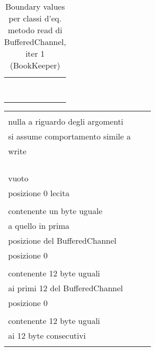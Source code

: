 \documentclass[10pt, a4paper]{article}
\newcommand{\Intmaketable}[4]{
	\begin{longtable}{#3}
	#4
	\caption{#2}
	\label{#1}
	\end{longtable}
}
\newcommand{\Intbvtable}[3]{
	\Intmaketable{#1}{#2}{|l|l|l|}{
	\hline
	\thead{Parametro formale} & \thead{Classe d'equivalenza} & \thead{Boundary value}\\
	\hline
	\hline
	#3
	\hline}
}
\newcommand{\Inttestctable}[3]{
	\Intmaketable{#1}{#2}{|l|l|l|}{
	\hline
	\thead{Input} & \thead{Esito atteso} & \thead{Motivazione}\\
	\hline
	\hline
	#3
	\hline}
}
\newcommand{\Intbvcaption}[4]{Boundary values per classi d'eq. metodo #1 di #2, iter #3 (#4)}
\newcommand{\Inttestccaption}[4]{Casi di test per metodo #1 di #2, iter. #3 (#4)}
\newcommand{\gettablelabel}[5]{table:#1:#2:#3:iter#4:proj#5}
\newcommand{\bvtable}[5]{
	\Intbvtable{\gettablelabel{bv}{#1}{#2}{#3}{#4}}
		{\Intbvcaption{#1}{#2}{#3}{#4}}
		{#5}
}
\newcommand{\testctable}[5]{
	\Inttestctable{\gettablelabel{testc}{#1}{#2}{#3}{#4}}
		{\Inttestccaption{#1}{#2}{#3}{#4}}
		{#5}
}
\newcommand{\tcell}{\makecell[tl]}
\newcommand{\newtrow}{\\ \hline}
\def\bookkeeper{BookKeeper}
\newcommand{\ceq}[1]{\{#1\}}
\begin{document}
	\bvtable{read}{BufferedChannel}{1}{\bookkeeper}{
			\tcell{dest} & \tcell{\ceq{null}} & \tcell{null}
		\newtrow
			\tcell{dest} & \tcell{\ceq{buffer di destinazione vuoto}} & \tcell{ByteBuf()}
		\newtrow
			\tcell{pos} & \tcell{\ceq{$< 0$}} & \tcell{$-1$}
		\newtrow
			\tcell{pos} & \tcell{\ceq{$\ge 0$}} & \tcell{$0$}
		\newtrow
			\tcell{length} & \tcell{\ceq{$< 0$}} & \tcell{$-1$}
		\newtrow
			\tcell{length} & \tcell{\ceq{$0$}} & \tcell{$0$}
		\newtrow
			\tcell{length} & \tcell{\ceq{$\ge 1$}} & \tcell{1}
		\newtrow
	}
	
	\testctable{read}{BufferedChannel}{1}{\bookkeeper}{
				\tcell{null, 0, 0} & 
				\tcell{NullPointerException viene lanciata} & 
				\tcell{
					La documentazione non specifica\\
					nulla a riguardo degli argomenti\\
					si assume comportamento simile a\\
					write} 
		\newtrow
			\tcell{ByteBuf(), -1, -1} & 
			\tcell{IllegalArgumentException viene lanciata} & 
			\tcell{pos e length non possono essere $<$ 0}	
		\newtrow
			\tcell{ByteBuf(), -1, 0} & 
			\tcell{IllegalArgumentException viene lanciata} & 
			\tcell{pos non può essere $<$ 0}
		\newtrow
			\tcell{ByteBuf(), 0, -1} & 
			\tcell{IllegalArgumentException viene lanciata} & 
			\tcell{length non può essere $<$ 0}
		\newtrow
			\tcell{ByteBuf(), 0, 0} & 
			\tcell{
				Buffer destinazione\\ 
				vuoto} & 
			\tcell{
				Lettura di 0 byte dalla\\
				posizione 0 lecita}
		\newtrow
			\tcell{ByteBuf(), 0, 1} & 
			\tcell{
				Buffer destinazione\\ 
				contenente un byte uguale\\ 
				a quello in prima\\ 
				posizione del BufferedChannel} & 
			 \tcell{
			 	Lettura di 1 byte dalla\\
			 	posizione 0}
		\newtrow
			\tcell{ByteBuf(), 0, 12} & 
			\tcell{
				Buffer destinazione\\ 
				contenente 12 byte uguali\\ 
				ai primi 12 del BufferedChannel} & 
			\tcell{
				Lettura di 12 byte dalla\\
				posizione 0}
		\newtrow
			\tcell{ByteBuf(), 1, 12} & 
			\tcell{
				Buffer destinazione\\ 
				contenente 12 byte uguali\\ 
				ai 12 byte consecutivi\\
}}
\end{document}
